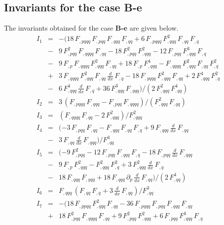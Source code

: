 \begin{appendix}
\section{Invariants for the case B-e}
\label{ap_Be}
The invariants obtained for the case {\bf B-e} are given below.
\begin{eqnarray}
\label{BeI1}
I_{1}&=&-(18\,F_{,pqqq}\,F_{,pqq}\,F_{,qqq}\,F_{,qq} + 6\,F_{,pqqq}
\,F_{,qqq}^{2}\,F_{,qq}\,F_{,q} \nonumber \\
&-& 9\,F_{,pqq}^{2}\,F_{,qqqq}\,F_{,qq} - 18\,F_{,pqq}^{2}\,F_{,qqq}^{2} 
- 12\,F_{,pqq}\,F_{,qqq}^{3}\,F_{,q} \nonumber \\
&-& 9\,F_{,p}\,F_{,qqqq}\,F_{,qqq}^{2}\,F_{,qq} 
+18\,F_{,p}\,F_{,qqq}^{4} - F_{,qqqq}\,F_{,qqq}^{2}\,F_{,qq}\,F_{,q}^{2} 
\nonumber \\&
+& 3\,F_{,qqqq}\,F_{,qqq}^{2}\,F_{,qq}\,\frac{d}{dx}\,F_{,q}
- 18\,F_{,yqqq}\,F_{,qqq}^{2}\,F_{,qq} + 2\,F_{,qqq}^{4}\,F_{,q}^{2} 
\nonumber \\&-& 6\,F_{,qqq}^{4}\,\frac{d}{dx}\,F_{,q} 
+ 36\,F_{,qqq}^{3}\,F_{,yqq})/(2\,F_{,qqq}^{2}\,F_{,qq}^{4}) \\
%
\label{BeI2}
I_{2}&=&3\,( F_{,pqqq}\,F_{,qqq} - F_{,pqq}\,F_{,qqqq})
/(F_{,qqq}^{2}\,F_{,qq}) \\
%
\label{BeI3}
I_{3}&=&( F_{,qqqq}\,F_{,qq} - 2\,F_{,qqq}^{2})/F_{,qqq}^{2} \\
%
\label{BeI4}
I_{4}&=&( - 3\,F_{,pqq}\,F_{,qq} - F_{,qqq}\,F_{,qq}\,F_{,q} 
+ 9\,F_{,qqq}\,\frac{d}{dx}\,F_{,qq} \nonumber \\
&-& 3\,F_{,qq}\,\frac{d}{dx}\,F_{,qqq})/F_{,qq}^{3} \\
%
\label{BeI5}
I_{5}&=&( - 9\,F_{,pqq}^{2} - 12\,F_{,pqq}\,F_{,qqq}\,F_{,q} 
- 18\,F_{,pqq}\,\frac{d}{dx}\,F_{,qqq} \nonumber \\
&-& 9\,F_{,p}\,F_{,qqq}^{2} - F_{,qqq}^{2}\,F_{,q}^{2} 
+ 3\,F_{,qqq}^{2}\,\frac{d}{dx}\,F_{,q} \nonumber \\
&-& 18\,F_{,qqq}\,F_{,yqq} 
+ 18\,F_{,qqq}\,\partial_{p}\,\frac{d}{dx}\,F_{,qq})/(2\,F_{,qq}^{4}) \\
%
\label{BeI6}
I_{6}&=&F_{,qqq}\,(F_{,qq}\,F_{,q} + 3\,\frac{d}{dx}\,F_{,qq})/F_{,qq}^{3} \\
%
\label{BeI7}
I_{7}&=&-(18\,F_{,ppqq}\,F_{,qqq}^{2}\,F_{,qq} 
- 36\,F_{,pqqq}\,F_{,pqq}\,F_{,qqq}\,F_{,qq} \nonumber \\
&+& 18\,F_{,pqq}^{2}\,F_{,qqqq}\,F_{,qq} 
+ 9\,F_{,pqq}^{2}\,F_{,qqq}^{2} + 6\,F_{,pqq}\,F_{,qqq}^{3}\,F_{,q} 

\end{eqnarray}
\end{appendix}
